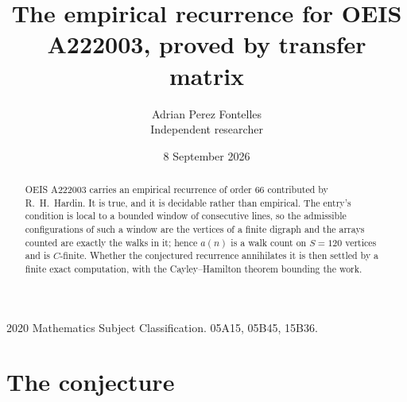 \documentclass[11pt,a4paper]{article}
\title{The empirical recurrence for OEIS A222003, proved by transfer matrix}
\author{Adrian Perez Fontelles\\ \small Independent researcher}
\date{8 September 2026}
\theoremstyle{plain}
\theoremstyle{definition}
\begin{document}
\maketitle

\begin{abstract}
OEIS A222003 carries an empirical recurrence of order $66$ contributed by R.~H.~Hardin. It is
true, and it is decidable rather than empirical. The entry's condition is local to a bounded window of consecutive lines, so
the admissible configurations of such a window are the vertices of a finite digraph and the
arrays counted are exactly the walks in it; hence $a(n)$ is a walk count on $S=120$ vertices
and is $C$-finite. Whether the conjectured recurrence annihilates it is then settled by a
finite exact computation, with the Cayley--Hamilton theorem bounding the work.
\end{abstract}

\noindent\small 2020 Mathematics Subject Classification. 05A15, 05B45, 15B36.\normalsize

\section{The conjecture}
\end{document}
